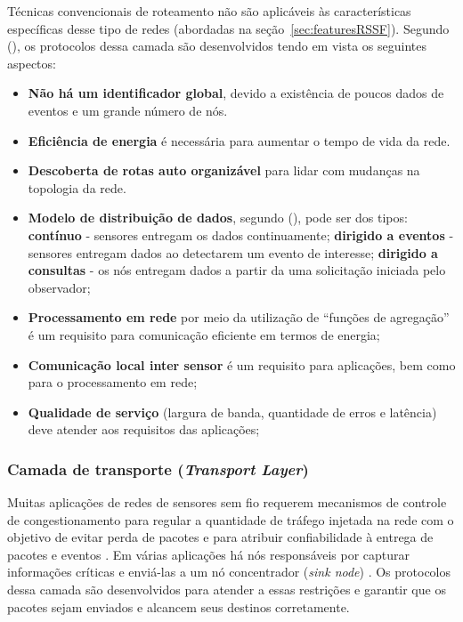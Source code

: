  Técnicas convencionais de roteamento não são aplicáveis às características específicas desse tipo de redes (abordadas na seção~\ref{sec:featuresRSSF}). Segundo  (\citeyear{Guerses2005}), os protocolos dessa camada são desenvolvidos tendo em vista os seguintes aspectos:
 
 \begin{itemize}
 \item \textbf{Não há um identificador global}, devido a existência de poucos dados de eventos e um grande número de nós.
 \item \textbf{Eficiência de energia} é necessária para aumentar o tempo de vida da rede.
 \item \textbf{Descoberta de rotas auto organizável} para lidar com mudanças na topologia da rede.
 \item \textbf{Modelo de distribuição de dados}, segundo  (\citeyear{Tilak02ataxonomy}), pode ser dos tipos:
 \subitem \textbf{contínuo} - sensores entregam os dados continuamente;
 \subitem \textbf{dirigido a eventos} - sensores entregam dados ao detectarem um evento de interesse;
 \subitem \textbf{dirigido a consultas} - os nós entregam dados a partir da uma solicitação iniciada pelo observador;
 \item \textbf{Processamento em rede} por meio da utilização de ``funções de agregação'' é um requisito para comunicação eficiente em termos de energia;
 \item \textbf{Comunicação local inter sensor} é um requisito para aplicações, bem como para o processamento em rede;
 \item \textbf{Qualidade de serviço} (largura de banda, quantidade de erros e latência) deve atender aos requisitos das aplicações; 
 
 \end{itemize}

 \subsubsection{Camada de transporte (\emph{Transport Layer})} 
 
 Muitas aplicações de redes de sensores sem fio requerem mecanismos de controle de congestionamento para regular a quantidade de tráfego injetada na rede com o objetivo de evitar perda de pacotes e para atribuir confiabilidade à entrega de pacotes e eventos \cite{RaSaGu2008-InCol}. Em várias aplicações há nós responsáveis por capturar informações críticas e enviá-las a um nó concentrador (\textit{sink node}) \cite{RaSaGu2008-InCol}. Os protocolos dessa camada são desenvolvidos para atender a essas restrições e garantir que os pacotes sejam enviados e alcancem seus destinos corretamente.

